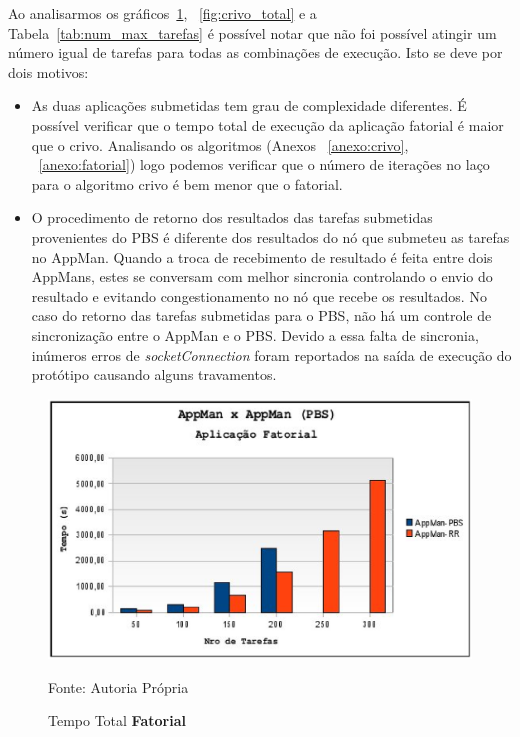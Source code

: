 Ao analisarmos os gráficos~\ref{fig:fatorial_total}, ~\ref{fig:crivo_total} e a Tabela~\ref{tab:num_max_tarefas} é possível notar que não foi possível atingir um número igual de tarefas para todas as combinações de execução. Isto se deve por dois motivos:

\begin{itemize}
	\item As duas aplicações submetidas tem grau de complexidade diferentes.
		É possível verificar que o tempo total de execução da aplicação fatorial é maior que o crivo. Analisando os algoritmos (Anexos ~\ref{anexo:crivo}, ~\ref{anexo:fatorial}) logo podemos verificar que o número de iterações no laço para o algoritmo crivo é bem menor que o fatorial.
	\item O procedimento de retorno dos resultados das tarefas submetidas provenientes do PBS é diferente dos resultados do nó que submeteu as tarefas no AppMan. Quando a troca de recebimento de resultado é feita entre dois AppMans, estes se conversam com melhor sincronia controlando o envio do resultado e evitando congestionamento no nó que recebe os resultados. No caso do retorno das tarefas submetidas para o PBS, não há um controle de sincronização entre o AppMan e o PBS. Devido a essa falta de sincronia, inúmeros erros de \emph{socketConnection} foram reportados na saída de execução do protótipo causando alguns travamentos.
\end{itemize}

\begin{figure}[htb]
\begin{center}
\includegraphics[scale=0.77]{./img/MapaFatorialTempoTotal.ps}
\caption{Tempo Total \textbf{Fatorial}}
\label{fig:fatorial_total}
Fonte: Autoria Própria
\end{center}
\end{figure}

